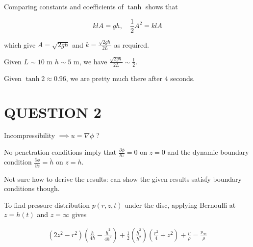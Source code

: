 \documentclass[a4paper]{article}
\begin{document}
Comparing constants and coefficients of $ \tanh $ shows that

\[ klA = gh, \quad \frac{1}{2} A^{2} = k l A \]

which give $ A = \sqrt{2gh} $ and $ k = \frac{\sqrt{2gh}}{2L} $ as required. 

Given $ L \sim 10  $ m $ h \sim 5 $ m, we have $ \frac{\sqrt{2gh}}{2L} \sim \frac{1}{2}$.

Given $ \tanh 2 \approx 0.96$, we are pretty much there after $ 4 $ seconds.  





\section{QUESTION 2}

\begin{center}
\end{center}

Incompressibility $ \implies u = \nabla \phi $ ?

No penetration conditions imply that $ \frac{\partial \phi }{\partial z} = 0 $ on $ z = 0 $ and the dynamic boundary condition $ \frac{\partial \phi }{\partial z} = \dot{h} $ on $ z = h $.

Not sure how to derive the results: can show the given results satisfy boundary conditions though.

To find pressure distribution $ p(r,z,t) $ under the disc, applying Bernoulli at $ z = h(t) $ and $ z = \infty $ gives

\begin{align*}
(2z^{2} - r^{2}) \left(  \frac{\ddot{h}}{4h} - \frac{\dot{h}^{2}}{4h^{2}} \right)  + \frac{1}{2} \left( \frac{\dot{h}^{2}}{h^{2}} \right) \left(  \frac{r^{2}}{4} + z^{2} \right) + \frac{p}{\rho} =  \frac{p_{\infty}}{\rho} \\ 
\end{align*}
\end{document}
